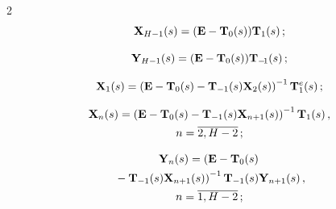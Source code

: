 \begin{multicols}{2}
$$


\bmx{X}_{H-1}(s)=(\bmx{E}-\bmx{T}_0(s))\bmx{T}_1(s)\,;


$$


$$


\bmx{Y}_{H-1}(s)=(\bmx{E}-\bmx{T}_0(s))\bmx{T}_{-\!1}(s)\,;


$$


$$


\bmx{X}_{1}(s)=


\left(\bmx{E}-\bmx{T}_0(s)-\bmx{T}_{-1}(s)\bmx{X}_{2}(s)\right)^{-1}\bmx{T}^e_1(s)\,; 


$$





\vspace*{-12pt}





\noindent


\begin{multline*}


\bmx{X}_{n}(s)=\left(\bmx{E}-\bmx{T}_0(s)-\bmx{T}_{-1}(s)\bmx{X}_{n+1}(s)\right)^{-1}


\bmx{T}_1(s)\,, \\


n=\overline{2,H-2}\,;


\end{multline*}





\vspace*{-12pt}





\noindent


\begin{multline*}


\bmx{Y}_{n}(s)=\left(\bmx{E}-\bmx{T}_0(s)\right.\\


\left.{}-\bmx{T}_{-1}(s)\bmx{X}_{n+1}(s)\right)^{-1}


\bmx{T}_{-1}(s)\bmx{Y}_{n+1}(s)\,,


\\ 


 n=\overline{1,H-2}\,;


\end{multline*}





\vspace*{-12pt}






\end{multicols}
